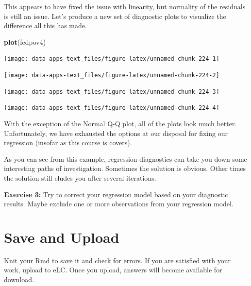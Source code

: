 \documentclass[
]{book}
\makeatletter
\newenvironment{Shaded}{\begin{snugshade}}{\end{snugshade}}
\newcommand{\FunctionTok}[1]{\textcolor[rgb]{0.27,0.27,0.27}{\textbf{#1}}}
\newcommand{\NormalTok}[1]{#1}
\newenvironment{kframe}{%
\medskip{}
\setlength{\fboxsep}{.8em}
 \def\at@end@of@kframe{}%
 \ifinner\ifhmode%
  \def\at@end@of@kframe{\end{minipage}}%
  \begin{minipage}{\columnwidth}%
 \fi\fi%
 \def\FrameCommand##1{\hskip\@totalleftmargin \hskip-\fboxsep
 \colorbox{shadecolor}{##1}\hskip-\fboxsep
     \hskip-\linewidth \hskip-\@totalleftmargin \hskip\columnwidth}%
 \MakeFramed {\advance\hsize-\width
   \@totalleftmargin\z@ \linewidth\hsize
   \@setminipage}}%
 {\par\unskip\endMakeFramed%
 \at@end@of@kframe}
\renewenvironment{Shaded}{\begin{kframe}}{\end{kframe}}
\newenvironment{rmdblock}[1]
  {\begin{shaded*}
  }
  {\end{shaded*}
  }
\newenvironment{learncheck}
  {\begin{rmdblock}{warning}}
  {\end{rmdblock}}
\makeatother
\begin{document}
This appears to have fixed the issue with linearity, but normality of the residuals is still an issue. Let's produce a new set of diagnostic plots to visualize the difference all this has made.

\begin{Shaded}
\begin{Highlighting}[]
\FunctionTok{plot}\NormalTok{(fedpov4)}
\end{Highlighting}
\end{Shaded}

\begin{center}\texttt{[image: data-apps-text\_files/figure-latex/unnamed-chunk-224-1]} \end{center}

\begin{center}\texttt{[image: data-apps-text\_files/figure-latex/unnamed-chunk-224-2]} \end{center}

\begin{center}\texttt{[image: data-apps-text\_files/figure-latex/unnamed-chunk-224-3]} \end{center}

\begin{center}\texttt{[image: data-apps-text\_files/figure-latex/unnamed-chunk-224-4]} \end{center}

With the exception of the Normal Q-Q plot, all of the plots look much better. Unfortunately, we have exhausted the options at our disposal for fixing our regression (insofar as this course is covers).

As you can see from this example, regression diagnostics can take you down some interesting paths of investigation. Sometimes the solution is obvious. Other times the solution still eludes you after several iterations.

\begin{learncheck}
\textbf{Exercise 3:} Try to correct your regression model based on your
diagnostic results. Maybe exclude one or more observations from your
regression model.
\end{learncheck}

\hypertarget{save-and-upload-8}{%
\section{Save and Upload}\label{save-and-upload-8}}

Knit your Rmd to save it and check for errors. If you are satisfied with your work, upload to eLC. Once you upload, answers will become available for download.
\end{document}
